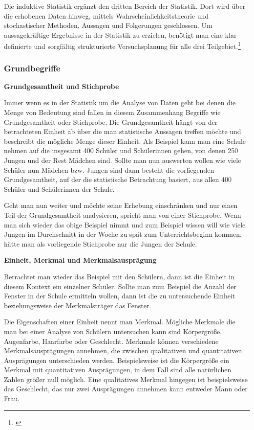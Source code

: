 Die induktive Statistik ergänzt den dritten Bereich der Statistik. Dort wird über die erhobenen Daten hinweg, mittels Wahrscheinlichkeitstheorie und stochastischer Methoden, Aussagen und Folgerungen geschlossen. Um aussagekräftige Ergebnisse in der Statistik zu erzielen, benötigt man eine klar definierte und sorgfältig strukturierte Versuchsplanung für alle drei Teilgebiet.\footnote{\cite[vgl.][12]{Fahrmeir2016}}


\subsubsection{Grundbegriffe}
\textbf{Grundgesamtheit und Stichprobe}

Immer wenn es in der Statistik um die Analyse von Daten geht bei denen die Menge von Bedeutung sind fallen in diesem Zusammenhang Begriffe wie Grundgesamtheit oder Stichprobe. Die Grundgesamtheit hängt von der betrachteten Einheit ab über die man statistische Aussagen treffen möchte und beschreibt die mögliche Menge dieser Einheit. Als Beispiel kann man eine Schule nehmen auf die insgesamt 400 Schüler und Schülerinnen gehen, von denen 250 Jungen und der Rest Mädchen sind. Sollte man nun auswerten wollen wie viele Schüler nun Mädchen bzw. Jungen sind dann besteht die vorliegenden Grundgesamtheit, auf der die statistische Betrachtung basiert, aus allen 400 Schüler und Schülerinnen der Schule.

Geht man nun weiter und möchte seine Erhebung einschränken und nur einen Teil der Grundgesamtheit analysieren, spricht man von einer Stichprobe. Wenn man sich wieder das obige Beispiel nimmt und zum Beispiel wissen will wie viele Jungen im Durchschnitt in der Woche zu spät zum Unterrichtsbeginn kommen, hätte man als vorliegende Stichprobe nur die Jungen der Schule.

\textbf{Einheit, Merkmal und Merkmalsausprägung}

Betrachtet man wieder das Beispiel mit den Schülern, dann ist die Einheit in diesem Kontext ein einzelner Schüler. Sollte man zum Beispiel die Anzahl der Fenster in der Schule ermitteln wollen, dann ist die zu untersuchende Einheit beziehungsweise der Merkmalsträger das Fenster.

Die Eigenschaften einer Einheit nennt man Merkmal. Mögliche Merkmale die man bei einer Analyse von Schülern untersuchen kann sind Körpergröße, Augenfarbe, Haarfarbe oder Geschlecht. Merkmale können verschiedene Merkmalsausprägungen annehmen, die zwischen qualitativen und quantitativen Ausprägungen unterschieden werden. Beispielsweise ist die Körpergröße ein Merkmal mit quantitativen Ausprägungen, in dem Fall sind alle natürlichen Zahlen größer null möglich. Eine qualitatives Merkmal hingegen ist beispielsweise das Geschlecht, das nur zwei Ausprägungen annehmen kann entweder Mann oder Frau.

